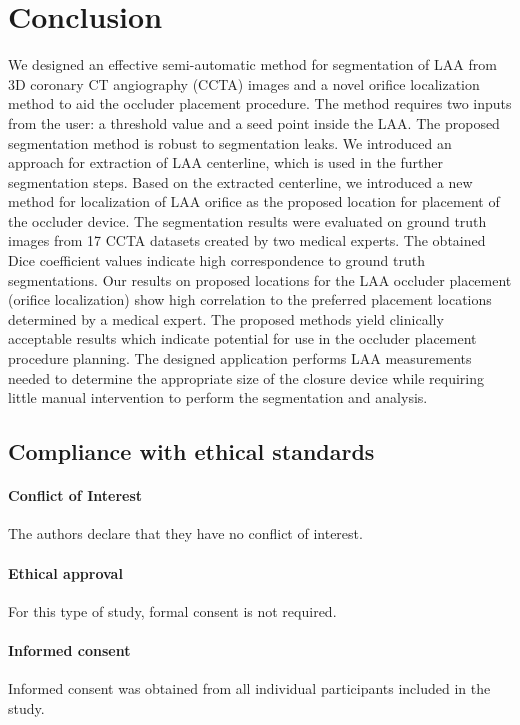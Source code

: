 \documentclass[review]{elsarticle}
\begin{document}
\section{Conclusion}
\label{sec:conclusion}

We designed an effective semi-automatic method for segmentation of LAA from 3D
coronary CT angiography (CCTA) images and a novel orifice localization method
to aid the occluder placement procedure. The method requires two inputs from
the user: a threshold value and a seed point inside the LAA. The proposed
segmentation method is robust to segmentation leaks.  We introduced an approach
for extraction of LAA centerline, which is used in the further segmentation
steps.  Based on the extracted centerline, we introduced a new method for
localization of LAA orifice as the proposed location for placement of the
occluder device. The segmentation results were evaluated on ground truth images
from 17 CCTA datasets created by two medical experts. The obtained Dice
coefficient values indicate high correspondence to ground truth segmentations. 
Our results on proposed locations for the LAA occluder placement (orifice
localization) show high correlation to the preferred placement locations
determined by a medical expert.  The proposed methods yield clinically
acceptable results which indicate potential for use in the occluder placement
procedure planning. The designed application performs LAA measurements needed
to determine the appropriate size of the closure device while requiring little
manual intervention to perform the segmentation and analysis.

\subsection{Compliance with ethical standards}

\paragraph{\textbf{Conflict of Interest}} The authors declare that they have no
conflict of interest.

\paragraph{\textbf{Ethical approval}} For this type of study, formal consent is 
not required.

\paragraph{\textbf{Informed consent}} Informed consent was obtained from all
individual participants included in the study.
\end{document}
